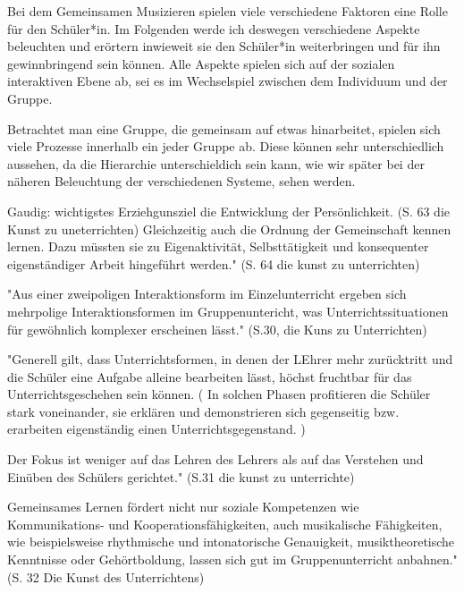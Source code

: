 









Bei dem Gemeinsamen Musizieren spielen viele verschiedene Faktoren eine Rolle
für den Schüler*in. Im Folgenden werde ich deswegen verschiedene Aspekte
beleuchten und erörtern inwieweit sie den Schüler*in weiterbringen und für ihn
gewinnbringend sein können.
Alle Aspekte spielen sich auf der sozialen interaktiven Ebene ab, sei es im
Wechselspiel zwischen dem Individuum und der Gruppe. 

Betrachtet man eine Gruppe, die gemeinsam auf etwas hinarbeitet, spielen sich
viele Prozesse innerhalb ein jeder Gruppe ab. Diese können sehr unterschiedlich
aussehen, da die Hierarchie unterschieldich sein kann, wie wir später bei der
näheren Beleuchtung der verschiedenen Systeme, sehen werden. 


Gaudig: wichtigstes Erziehgunsziel die Entwicklung der Persönlichkeit. (S. 63
die Kunst zu uneterrichten) Gleichzeitig auch die Ordnung der Gemeinschaft
kennen lernen. Dazu müssten sie zu Eigenaktivität, Selbsttätigkeit und konsequenter
eigenständiger Arbeit hingeführt werden." (S. 64 die kunst zu unterrichten)

"Aus einer zweipoligen Interaktionsform im Einzelunterricht ergeben sich
mehrpolige Interaktionsformen im Gruppenuntericht, was Unterrichtssituationen
für gewöhnlich komplexer erscheinen lässt." (S.30, die Kuns zu Unterrichten)


"Generell gilt, dass Unterrichtsformen, in denen der LEhrer mehr zurücktritt und
die Schüler eine Aufgabe alleine bearbeiten lässt, höchst fruchtbar für das
Unterrichtsgeschehen sein können. ( In solchen Phasen profitieren die Schüler
stark voneinander, sie erklären und demonstrieren sich gegenseitig bzw.
erarbeiten eigenständig einen Unterrichtsgegenstand. ) 

Der Fokus ist weniger auf
das Lehren des Lehrers als auf das Verstehen und Einüben des Schülers
gerichtet."  (S.31 die kunst zu unterrichte)


Gemeinsames Lernen fördert nicht nur soziale Kompetenzen wie Kommunikations- und
Kooperationsfähigkeiten, auch musikalische Fähigkeiten, wie beispielsweise
rhythmische und intonatorische Genauigkeit, musiktheoretische Kenntnisse oder
Gehörtboldung, lassen sich gut im Gruppenunterricht anbahnen." (S. 32 Die Kunst
des Unterrichtens)


